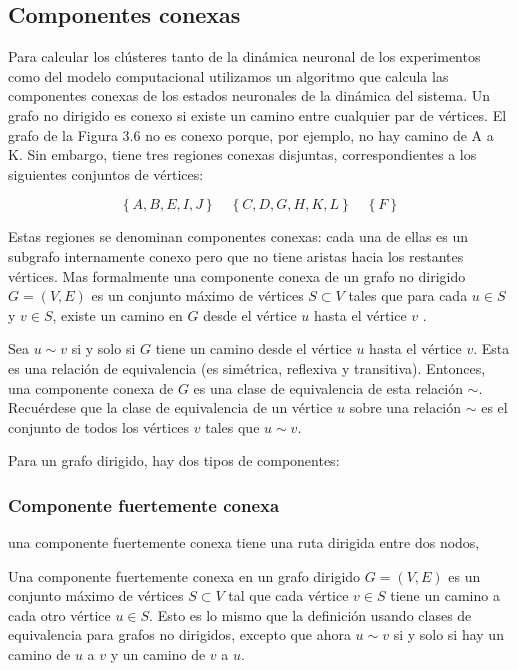 \subsection{ Componentes conexas }

Para calcular los clústeres   tanto de la dinámica neuronal de los experimentos como del modelo computacional utilizamos un algoritmo que calcula las  componentes conexas de los estados neuronales de la dinámica del sistema.   Un grafo no dirigido es conexo si existe un camino entre cualquier par de vértices. El grafo de la Figura 3.6 no es conexo porque, por ejemplo, no hay camino de A a K. Sin embargo, tiene tres regiones conexas disjuntas, correspondientes a los siguientes conjuntos de vértices:

\begin{equation*}
	\left\{A,B,E,I,J\right\} \quad \left\{ C,D,G,H,K,L\right\} \quad \left\{ F\right\}
\end{equation*}

Estas regiones se denominan componentes conexas: cada una de ellas es un subgrafo internamente conexo pero que no tiene aristas hacia los restantes vértices.   Mas formalmente  una componente conexa de un grafo no dirigido $G = (V, E)$ es un conjunto máximo de vértices $S \subset V$ tales que para cada $u \in  S$ y $v \in  S$, existe un camino en $G$ desde el vértice $u$ hasta el vértice $v$ \cite{componetes1}.

\begin{definitionT}
	Sea $u \sim v$ si y solo si $G$ tiene un camino desde el vértice $u$ hasta el vértice $v$. Esta es una relación de equivalencia (es simétrica, reflexiva y transitiva). Entonces, una componente conexa de $G$ es una clase de equivalencia de esta relación $\sim$. Recuérdese que la clase de equivalencia de un vértice $u$ sobre una relación $\sim$ es el conjunto de todos los vértices $v$ tales que $u \sim  v$.
\end{definitionT}

Para un grafo dirigido, hay dos tipos de componentes: 

\subsubsection{Componente fuertemente conexa}


una componente fuertemente conexa tiene una ruta dirigida entre dos nodos, 
\begin{definitionT}
	Una componente fuertemente conexa en un grafo dirigido $G = (V, E)$ es un conjunto máximo de vértices $S \subset V$ tal que cada vértice  $v \in S$ tiene un camino a cada otro vértice $u\in S$. Esto es lo mismo que la definición usando clases de equivalencia para grafos no dirigidos, excepto que ahora $u \sim v$  si y solo si hay un camino de $u$ a $v$ y un camino de $v$ a $u$.
\end{definitionT}

